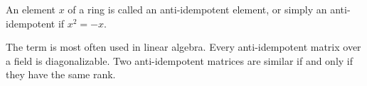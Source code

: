 \documentclass[12pt]{article}
\newcommand{\<}{\langle}
\renewcommand{\>}{\rangle}
\begin{document}
An element $x$ of a ring is called an anti-idempotent element, or simply an anti-idempotent if $x^2=-x$.

The term is most often used in linear algebra.  Every anti-idempotent matrix over a field is diagonalizable.  Two anti-idempotent matrices are similar if and only if they have the same rank.
\end{document}
